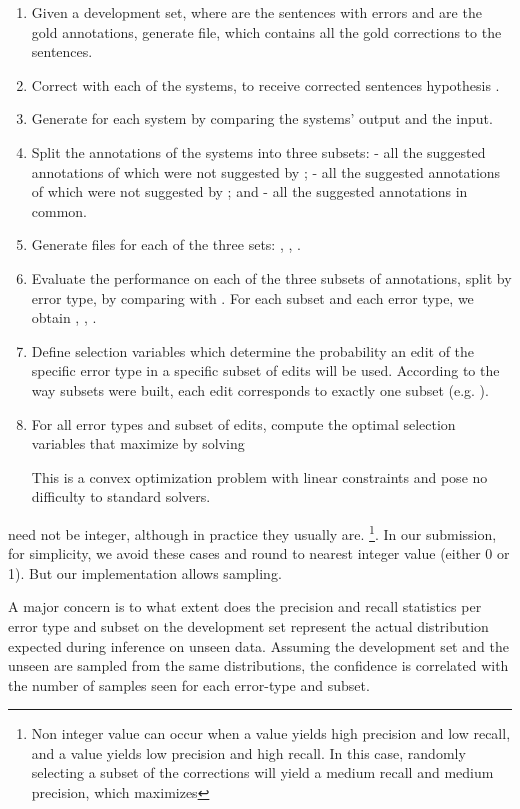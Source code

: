\documentclass[11pt,a4paper]{article}
\begin{document}
 \begin{enumerate}
\item Given a development set, where  are the sentences with errors and  are the gold annotations, generate  file, which contains all the gold corrections to the sentences.
 \item Correct  with each of the systems, to receive corrected sentences hypothesis .
 \item Generate  for each system  by comparing the systems' output  and the  input. 
 \item Split the annotations of the systems into three subsets:  - all the suggested annotations of  which were not suggested by ;  - all the suggested annotations of  which were not suggested by ; and  - all the suggested annotations in common.
 \item Generate  files for each of the three sets: , , .
 \item Evaluate the performance on each of the three subsets of annotations, split by error type, by comparing  with . For each subset and each error type, we obtain ,   ,  .
 \item Define selection variables  which determine the probability an edit of the specific error type in a specific subset of edits will be used. According to the way subsets were built, each edit corresponds to exactly one subset (e.g. ).  
 \item For all error types and subset of edits, compute the optimal selection variables  that maximize  by solving
 
 This is a convex optimization problem with linear constraints and pose no difficulty to standard solvers.  
 \end{enumerate}
 
  need not be integer, although in practice they usually are.  \footnote{Non integer value can occur when a  value yields high precision and low recall, and a  value yields low precision and high recall. In this case, randomly selecting a subset of the corrections will yield a medium recall and medium precision, which maximizes }.  In our submission, for simplicity, we avoid these cases and round  to nearest integer value (either 0 or 1).  But our implementation allows sampling.
 
 A major concern is to what extent does the precision and recall statistics per error type and subset on the development set represent the actual distribution expected during inference on unseen data.  Assuming the development set and the unseen are sampled from the same distributions, the confidence is correlated with the number of samples seen for each error-type and subset.   
\end{document}
